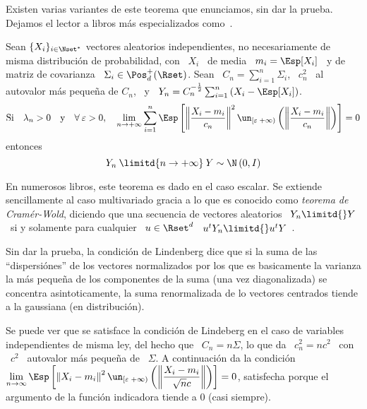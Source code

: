 Existen  varias   variantes  de  este   teorema  que  enunciamos,  sin   dar  la
prueba.  Dejamos el  lector a  libros m\'as  especializados como~\cite{AshDol99,
  Bil12, AthLah06, Lin22}.

\begin{teorema}\label{Teo:MP:LindenbergFeller}
%
  Sean  $\{  X_i \}_{i  \in  \Nset^*}$  vectores  aleatorios independientes,  no
  necesariamente de misma distribuci\'on de probabilidad, con \ $X_i$ \ de media
  \ $m_i = \Esp[X_i]$ \ y de matriz de covarianza \ $\Sigma_i \in \Pos_d^+(\Rset)$.
  Sean \ $C_n = \sum_{i=1}^n \Sigma_i$, \ $c_n^2$ \ al autovalor m\'as peque\~na
  de $C_n$,  \ y  \ $Y_n  = C_n^{-\frac12} \sum_{i=1}^n  \left( X_i  - \Esp[X_i]
  \right)$.
  \[
  \mbox{Si} \quad \lambda_n > 0 \quad \mbox{y} \quad \forall \: \varepsilon > 0,
  \quad  \lim_{n  \to  +\infty}  \sum_{i=1}^n  \Esp\left[  \left\|  \frac{X_i  -
        m_i}{c_n} \right\|^2  \un_{\left[ \varepsilon \;  +\infty \right)}\left(
      \left\| \frac{X_i - m_i}{c_n} \right\| \right) \right] = 0
  \]
  entonces
  \[
  Y_n \: \limitd{n \to +\infty} \: Y \sim \N\left( 0 , I \right)
  \]
\end{teorema}
%
En  numerosos libros,  este teorema  es  dado en  el caso  escalar. Se  extiende
sencillamente al caso multivariado gracia a lo que es conocido como {\it teorema
  de Cram\'er-Wold},  diciendo que una  secuencia de vectores aleatorios  \ $Y_n
\limitd{}  Y$ \  si y  solamente para  cualquier \  $u \in  \Rset^d$ \  $u^t Y_n
\limitd{} u^t Y$~\cite{AshDol99, AthLah06, Bil12}.

Sin dar  la prueba,  la condici\'on  de Lindenberg dice  que si  la suma  de las
``dispersi\'ones'' de  los vectores normalizados  por los que es  basicamente la
varianza  la   m\'as  peque\~na  de  los   componentes  de  la   suma  (una  vez
diagonalizada)  se  concentra  asintoticamente,  la  suma  renormalizada  de  lo
vectores centrados tiende a la gaussiana (en distribuci\'on).

Se  puede ver  que  se  satisface la  condici\'on  de Lindeberg  en  el caso  de
variables independientes de misma ley, del hecho  que \ $C_n = n \Sigma$, lo que
da \ $c_n^2 = n c^2$ \ con  \ $c^2$ \ autovalor m\'as peque\~na de \ $\Sigma$. A
continuaci\'on da la condici\'on \ $\displaystyle \lim_{n \to \infty} \Esp\left[
  \left\| X_i - m_i \right\|^2 \un_{\left[ \varepsilon \; +\infty \right)}\left(
    \left\|  \frac{X_i  -  m_i}{\sqrt{n}  c}  \right\|  \right)  \right]  =  0$,
satisfecha  porque el  argumento de  la funci\'on  indicadora tiende  a  0 (casi
siempre).

